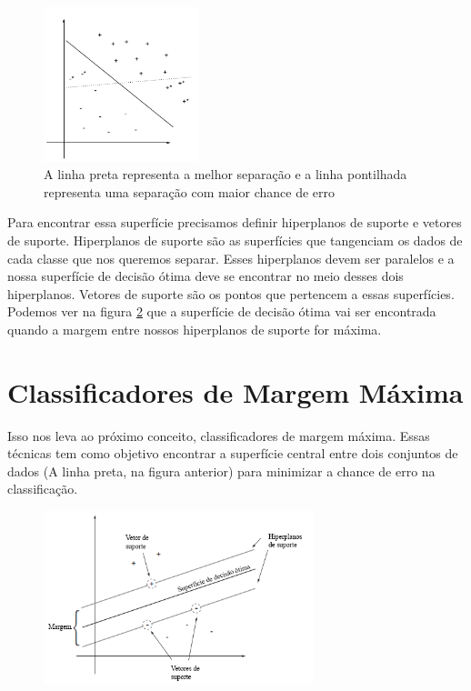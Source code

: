 \begin{figure}
  \centering
  \includegraphics[width=0.4\textwidth]{imagens/svm_2.png}
  \caption{A linha preta representa a melhor separação e a linha pontilhada representa uma separação com maior chance de erro}
  \label{fig:LABEL_FIG_2}
\end{figure}

Para encontrar essa superfície precisamos definir hiperplanos de suporte e vetores de suporte. Hiperplanos de suporte são as superfícies que tangenciam os dados de cada classe que nos queremos separar. Esses hiperplanos devem ser paralelos e a nossa superfície de decisão ótima deve se encontrar no meio desses dois hiperplanos. Vetores de suporte são os pontos que pertencem a essas superfícies.
Podemos ver na figura \ref{fig:LABEL_FIG_3} que a superfície de decisão ótima vai ser encontrada quando a margem entre nossos hiperplanos de suporte for máxima.

\section{Classificadores de Margem Máxima}
Isso nos leva ao próximo conceito, classificadores de margem máxima. Essas técnicas tem como objetivo encontrar a superfície central entre dois conjuntos de dados (A linha preta, na figura anterior) para minimizar a chance de erro na classificação.

\begin{figure}
  \centering
  \includegraphics[width=0.7\textwidth]{imagens/svm_3.png}
  \label{fig:LABEL_FIG_3}
\end{figure}

